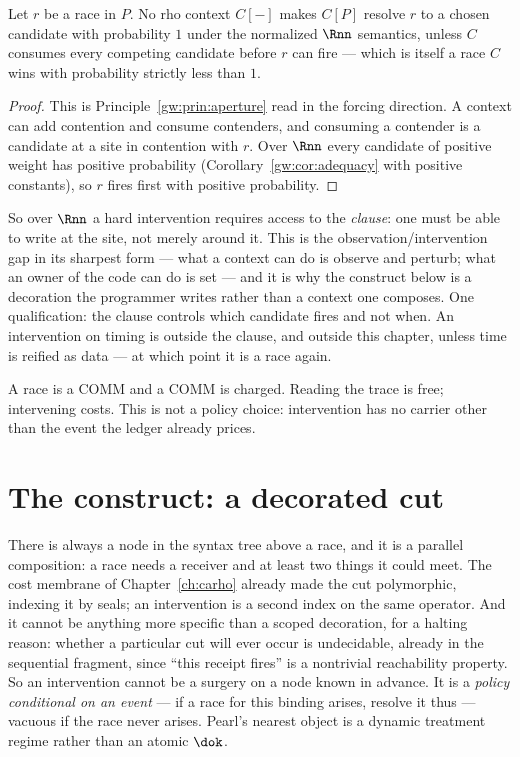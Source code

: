 \begin{proposition}
\label{do:prop:nocontext}
Let $r$ be a race in $P$. No rho context $C[-]$ makes $C[P]$ resolve $r$ to a chosen candidate
with probability $1$ under the normalized $\Rnn$ semantics, unless $C$ consumes every competing
candidate before $r$ can fire --- which is itself a race $C$ wins with probability strictly less
than $1$.
\end{proposition}

\begin{proof}
This is Principle~\ref{gw:prin:aperture} read in the forcing direction. A context can add
contention and consume contenders, and consuming a contender is a candidate at a site in
contention with $r$. Over $\Rnn$ every candidate of positive weight has positive probability
(Corollary~\ref{gw:cor:adequacy} with positive constants), so $r$ fires first with positive
probability.
\end{proof}

So over $\Rnn$ a hard intervention requires access to the \emph{clause}: one must be able to
write at the site, not merely around it. This is the observation/intervention gap in its
sharpest form --- what a context can do is observe and perturb; what an owner of the code can do
is set --- and it is why the construct below is a decoration the programmer writes rather than a
context one composes. One qualification: the clause controls which candidate fires and not when.
An intervention on timing is outside the clause, and outside this chapter, unless time is reified
as data --- at which point it is a race again.

\begin{principle}
\label{do:prin:metered}
A race is a COMM and a COMM is charged. Reading the trace is free; intervening costs. This is not a
policy choice: intervention has no carrier other than the event the ledger already prices.
\end{principle}

\section{The construct: a decorated cut}
\label{do:sec:construct}

There is always a node in the syntax tree above a race, and it is a parallel composition: a race
needs a receiver and at least two things it could meet. The cost membrane of
Chapter~\ref{ch:carho} already made the cut polymorphic, indexing it by seals; an intervention is a
second index on the same operator. And it cannot be anything more specific than a scoped
decoration, for a halting reason: whether a particular cut will ever occur is undecidable, already
in the sequential fragment, since ``this receipt fires'' is a nontrivial reachability property. So
an intervention cannot be a surgery on a node known in advance. It is a \emph{policy conditional on
an event} --- if a race for this binding arises, resolve it thus --- vacuous if the race never
arises. Pearl's nearest object is a dynamic treatment regime rather than an atomic $\dok$.

